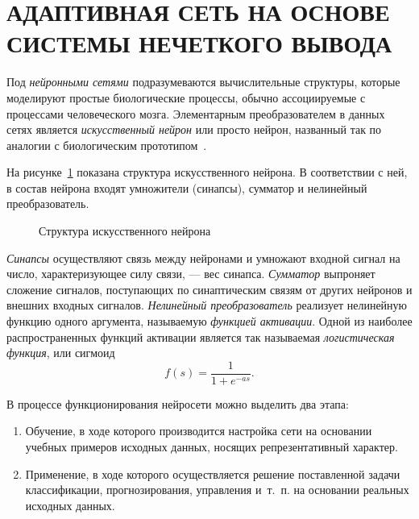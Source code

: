 \section[Адаптивная сеть на основе системы нечеткого вывода]{%
  АДАПТИВНАЯ СЕТЬ НА ОСНОВЕ СИСТЕМЫ НЕЧЕТКОГО ВЫВОДА
}

Под \emph{нейронными сетями} подразумеваются вычислительные структуры,
которые моделируют простые биологические процессы,
обычно ассоциируемые с процессами человеческого мозга.
Элементарным преобразователем в данных сетях является \emph{искусственный нейрон}
или просто нейрон, названный так по аналогии с биологическим прототипом~\cite{kruglov2001}.

На рисунке~\ref{fig:struct_neuron} показана структура искусственного нейрона.
В соответствии с ней, в состав нейрона входят умножители (синапсы),
сумматор и нелинейный преобразователь.

\begin{figure}[h!]
  \centering
  \caption{Структура искусственного нейрона}
  \label{fig:struct_neuron}
\end{figure}

\emph{Синапсы} осуществляют связь между нейронами и умножают входной сигнал на число,
характеризующее силу связи, --- вес синапса.
\emph{Сумматор} выпроняет сложение сигналов, поступающих по синаптическим связям от
других нейронов и внешних входных сигналов.
\emph{Нелинейный преобразователь} реализует нелинейную функцию одного аргумента,
называемую \emph{функцией активации}.
Одной из наиболее распространенных функций активации является
так называемая \emph{логистическая функция}, или сигмоид
\[
  f(s) = \dfrac{1}{1 + e^{-as}}.
\]

В процессе функционирования нейросети можно выделить два этапа:
\begin{enumerate}
\item Обучение, в ходе которого производится настройка сети на основании
  учебных примеров исходных данных, носящих репрезентативный характер.
\item Применение, в ходе которого осуществляется решение
  поставленной задачи классификации, прогнозирования, управления и~т.~п.
  на основании реальных исходных данных.
\end{enumerate}

